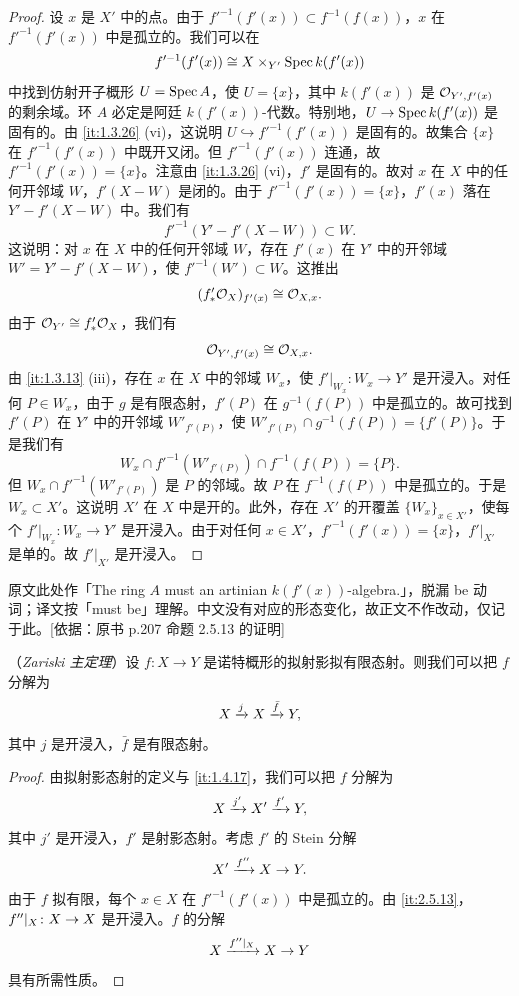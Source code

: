 \begin{proof}
设 $x$ 是 $X'$ 中的点。由于 $f'^{-1}(f'(x))\subset f^{-1}(f(x))$，$x$ 在 $f'^{-1}(f'(x))$ 中是孤立的。我们可以在
\[
f'^{-1}(f'(x))\cong X\times_{Y'}\operatorname{Spec} k(f'(x))
\]
中找到仿射开子概形 $U=\operatorname{Spec} A$，使 $U=\{x\}$，其中 $k(f'(x))$ 是 $\mathcal{O}_{Y',f'(x)}$ 的剩余域。环 $A$ 必定是阿廷 $k(f'(x))$-代数。特别地，$U\to\operatorname{Spec} k(f'(x))$ 是固有的。由 \ref{it:1.3.26} (vi)，这说明 $U\hookrightarrow f'^{-1}(f'(x))$ 是固有的。故集合 $\{x\}$ 在 $f'^{-1}(f'(x))$ 中既开又闭。但 $f'^{-1}(f'(x))$ 连通，故 $f'^{-1}(f'(x))=\{x\}$。注意由 \ref{it:1.3.26} (vi)，$f'$ 是固有的。故对 $x$ 在 $X$ 中的任何开邻域 $W$，$f'(X-W)$ 是闭的。由于 $f'^{-1}(f'(x))=\{x\}$，$f'(x)$ 落在 $Y'-f'(X-W)$ 中。我们有
\[
f'^{-1}(Y'-f'(X-W))\subset W.
\]
这说明：对 $x$ 在 $X$ 中的任何开邻域 $W$，存在 $f'(x)$ 在 $Y'$ 中的开邻域 $W'=Y'-f'(X-W)$，使 $f'^{-1}(W')\subset W$。这推出
\[
(f'_*\mathcal{O}_X)_{f'(x)}\cong\mathcal{O}_{X,x}.
\]
由于 $\mathcal{O}_{Y'}\cong f'_*\mathcal{O}_X$，我们有
\[
\mathcal{O}_{Y',f'(x)}\cong\mathcal{O}_{X,x}.
\]
由 \ref{it:1.3.13} (iii)，存在 $x$ 在 $X$ 中的邻域 $W_x$，使 $f'|_{W_x}\colon W_x\to Y'$ 是开浸入。对任何 $P\in W_x$，由于 $g$ 是有限态射，$f'(P)$ 在 $g^{-1}(f(P))$ 中是孤立的。故可找到 $f'(P)$ 在 $Y'$ 中的开邻域 $W'_{f'(P)}$，使 $W'_{f'(P)}\cap g^{-1}(f(P))=\{f'(P)\}$。于是我们有
\[
W_x\cap f'^{-1}(W'_{f'(P)})\cap f^{-1}(f(P))=\{P\}.
\]
但 $W_x\cap f'^{-1}(W'_{f'(P)})$ 是 $P$ 的邻域。故 $P$ 在 $f^{-1}(f(P))$ 中是孤立的。于是 $W_x\subset X'$。这说明 $X'$ 在 $X$ 中是开的。此外，存在 $X'$ 的开覆盖 $\{W_x\}_{x\in X'}$，使每个 $f'|_{W_x}\colon W_x\to Y'$ 是开浸入。由于对任何 $x\in X'$，$f'^{-1}(f'(x))=\{x\}$，$f'|_{X'}$ 是单的。故 $f'|_{X'}$ 是开浸入。
\end{proof}

\begin{tnote}
原文此处作「The ring $A$ must an artinian $k(f'(x))$-algebra.」，脱漏 be 动词；译文按「must be」理解。中文没有对应的形态变化，故正文不作改动，仅记于此。[依据：原书 p.207 命题 2.5.13 的证明]
\end{tnote}

\begin{theorem}\label{it:2.5.14}
（\emph{Zariski 主定理}）设 $f\colon X\to Y$ 是诺特概形的拟射影拟有限态射。则我们可以把 $f$ 分解为
\[
X\xrightarrow{j}X\xrightarrow{\bar f}Y,
\]
其中 $j$ 是开浸入，$\bar f$ 是有限态射。
\end{theorem}

\begin{proof}
由拟射影态射的定义与 \ref{it:1.4.17}，我们可以把 $f$ 分解为
\[
X\xrightarrow{j'}X'\xrightarrow{f'}Y,
\]
其中 $j'$ 是开浸入，$f'$ 是射影态射。考虑 $f'$ 的 Stein 分解
\[
X'\xrightarrow{f''}X\to Y.
\]
由于 $f$ 拟有限，每个 $x\in X$ 在 $f'^{-1}(f'(x))$ 中是孤立的。由 \ref{it:2.5.13}，$f''|_X\colon X\to X$ 是开浸入。$f$ 的分解
\[
X\xrightarrow{f''|_X}X\to Y
\]
具有所需性质。
\end{proof}

